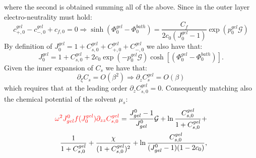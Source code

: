 \documentclass[12pt]{extarticle}
\begin{document}
where the second is obtained summing all of the above. 
Since in the outer layer electro-neutrality must hold:
\begin{equation}
c^{gel}_{+,0}-c^{gel}_{-,0}+c_{f,0} =0 \Rightarrow  \sinh(\Phi_0^{gel}-\Phi_0^{bath})= \frac{C_f}{2c_0 (J_0^{gel}-1)}\exp(p_0^{gel}\mathcal{G})\label{eq2}
\end{equation}
By definition of $J^{gel}_0=1+C^{gel}_{s,0}+C^{gel}_{+,0}+C^{gel}_{-,0}$ we also have that:
\begin{equation}
J^{gel}_0=1+C^{gel}_{s,0}+ 2c_0\exp(-p_0^{gel}\mathcal{G})\cosh[(\Phi^{gel}_0-\Phi_0^{bath})]\label{eq3}.
\end{equation}
Given the inner expansion of $C_s$ we have that:
\begin{equation}
\partial_\xi C_s = O(\beta^2) \Rightarrow \partial_z C^{gel}_{s} = O(\beta)
\end{equation}
which requires that at the leading order $\partial_z C^{gel}_{s,0} = 0$.
Consequently matching also the chemical potential of the solvent $\mu_s$:
\begin{equation}
\begin{aligned}
\color{red}\omega^2 J^0_{gel} f(J^{gel}_{0})\partial_{zz}C^{gel}_{s,0}\color{black}= \frac{J^0_{gel}-1}{J^0_{gel}} \mathcal{G}  + \ln \frac{C^{gel}_{s,0}}{1+C^{gel}_{s,0}} +\\ \frac{1}{1+C^{gel}_{s,0}}+\frac{\chi}{(1+C^{gel}_{s,0})^2} + \ln \frac{C^{gel}_{s,0}}{(J^0_{gel}-1)(1-2c_0)}, 
\end{aligned}\\[2.5mm]\label{eq4}
\end{equation}
\end{document}
